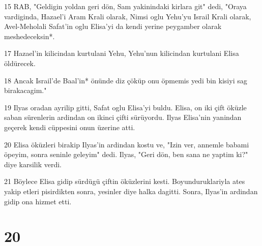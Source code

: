 \par 15 RAB, "Geldigin yoldan geri dön, Sam yakinindaki kirlara git" dedi, "Oraya vardiginda, Hazael'i Aram Krali olarak, Nimsi oglu Yehu'yu Israil Krali olarak, Avel-Meholali Safat'in oglu Elisa'yi da kendi yerine peygamber olarak meshedeceksin*.
\par 17 Hazael'in kilicindan kurtulani Yehu, Yehu'nun kilicindan kurtulani Elisa öldürecek.
\par 18 Ancak Israil'de Baal'in* önünde diz çöküp onu öpmemis yedi bin kisiyi sag birakacagim."
\par 19 Ilyas oradan ayrilip gitti, Safat oglu Elisa'yi buldu. Elisa, on iki çift öküzle saban sürenlerin ardindan on ikinci çifti sürüyordu. Ilyas Elisa'nin yanindan geçerek kendi cüppesini onun üzerine atti.
\par 20 Elisa öküzleri birakip Ilyas'in ardindan kostu ve, "Izin ver, annemle babami öpeyim, sonra seninle geleyim" dedi. Ilyas, "Geri dön, ben sana ne yaptim ki?" diye karsilik verdi.
\par 21 Böylece Elisa gidip sürdügü çiftin öküzlerini kesti. Boyunduruklariyla ates yakip etleri pisirdikten sonra, yesinler diye halka dagitti. Sonra, Ilyas'in ardindan gidip ona hizmet etti.

\chapter{20}


